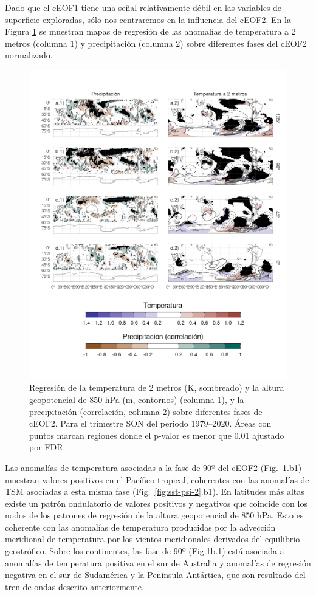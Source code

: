 \documentclass[12pt,oneside]{reedthesis}
\begin{document}
Dado que el cEOF1 tiene una señal relativamente débil en las variables de superficie exploradas, sólo nos centraremos en la influencia del cEOF2.
En la Figura \ref{fig:pp-temp-2} se muestran mapas de regresión de las anomalías de temperatura a 2 metros (columna 1) y precipitación (columna 2) sobre diferentes fases del cEOF2 normalizado.



\begin{figure}
\includegraphics{figures/20-ceofs/pp-temp-2-1} \caption{Regresión de la temperatura de 2 metros (K, sombreado) y la altura geopotencial de 850 hPa (m, contornos) (columna 1), y la precipitación (correlación, columna 2) sobre diferentes fases de cEOF2. Para el trimestre SON del periodo 1979--2020. Áreas con puntos marcan regiones donde el p-valor es menor que 0.01 ajustado por FDR.}\label{fig:pp-temp-2}
\end{figure}

Las anomalías de temperatura asociadas a la fase de 90º del cEOF2 (Fig.~\ref{fig:pp-temp-2}.b1) muestran valores positivos en el Pacífico tropical, coherentes con las anomalías de TSM asociadas a esta misma fase (Fig.~\ref{fig:sst-psi-2}.b1).
En latitudes más altas existe un patrón ondulatorio de valores positivos y negativos que coincide con los nodos de los patrones de regresión de la altura geopotencial de 850 hPa.
Esto es coherente con las anomalías de temperatura producidas por la advección meridional de temperatura por los vientos meridionales derivados del equilibrio geostrófico.
Sobre los continentes, las fase de 90º (Fig.\ref{fig:pp-temp-2}b.1) está asociada a anomalías de temperatura positiva en el sur de Australia y anomalías de regresión negativa en el sur de Sudamérica y la Península Antártica, que son resultado del tren de ondas descrito anteriormente.
\end{document}

